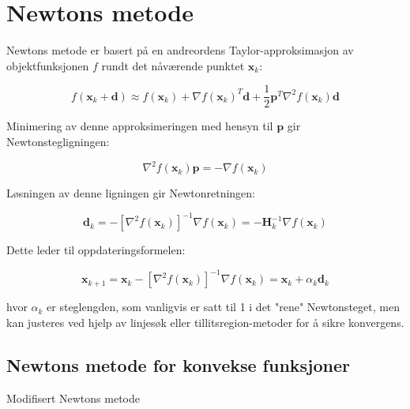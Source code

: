 \section{Newtons metode}
\label{sec:newtons_method}
Newtons metode er basert på en andreordens Taylor-approksimasjon av objektfunksjonen \(f\) rundt det nåværende punktet \(\symbf{x}_k\):

\[
	f(\symbf{x}_k + \symbf{d}) \approx f(\symbf{x}_k) + \nabla f(\symbf{x}_k)^T \symbf{d} + \frac{1}{2}\symbf{p}^T \nabla^2 f(\symbf{x}_k) \symbf{d}
\]

Minimering av denne approksimeringen med hensyn til \(\symbf{p}\) gir Newtonstegligningen:

\[
	\nabla^2 f(\symbf{x}_k) \symbf{p} = -\nabla f(\symbf{x}_k)
\]

Løsningen av denne ligningen gir Newtonretningen:

\[
	\symbf{d}_k = -[\nabla^2 f(\symbf{x}_k)]^{-1} \nabla f(\symbf{x}_k) = -\symbf{H}_k^{-1} \nabla f(\symbf{x}_k)
\]

Dette leder til oppdateringsformelen:

\[
	\mathbf{x}_{k+1} = \mathbf{x}_k - [\nabla^2 f(\mathbf{x}_k)]^{-1} \nabla f(\mathbf{x}_k) = \mathbf{x}_k + \alpha_k \mathbf{d}_k
\]

hvor \(\alpha_k\) er steglengden, som vanligvis er satt til 1 i det "rene" Newtonsteget, men kan justeres ved hjelp av linjesøk eller tillitsregion-metoder for å sikre konvergens.

\subsection{Newtons metode for konvekse funksjoner}
\label{subsec:newton_convex}

\begin{algorithm}[H]
	\SetAlgoLined
	\caption{Modifisert Newtons metode}
	\label{alg:modified_newton}
\end{algorithm}

